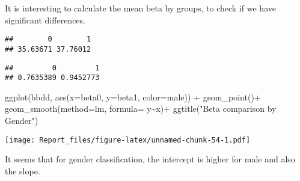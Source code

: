 \documentclass[
]{article}
\newenvironment{Shaded}{\begin{snugshade}}{\end{snugshade}}
\newcommand{\AttributeTok}[1]{\textcolor[rgb]{0.77,0.63,0.00}{#1}}
\newcommand{\FunctionTok}[1]{\textcolor[rgb]{0.00,0.00,0.00}{#1}}
\newcommand{\NormalTok}[1]{#1}
\newcommand{\OtherTok}[1]{\textcolor[rgb]{0.56,0.35,0.01}{#1}}
\newcommand{\SpecialCharTok}[1]{\textcolor[rgb]{0.00,0.00,0.00}{#1}}
\newcommand{\StringTok}[1]{\textcolor[rgb]{0.31,0.60,0.02}{#1}}
\begin{document}
It is interesting to calculate the mean beta by groups, to check if we
have significant differences.

\begin{Shaded}
\end{Shaded}

\begin{verbatim}
##        0        1 
## 35.63671 37.76012
\end{verbatim}

\begin{Shaded}
\end{Shaded}

\begin{verbatim}
##         0         1 
## 0.7635389 0.9452773
\end{verbatim}

\begin{Shaded}
\begin{Highlighting}[]
\FunctionTok{ggplot}\NormalTok{(bbdd, }\FunctionTok{aes}\NormalTok{(}\AttributeTok{x=}\NormalTok{beta0, }\AttributeTok{y=}\NormalTok{beta1, }\AttributeTok{color=}\NormalTok{male)) }\SpecialCharTok{+}
\FunctionTok{geom\_point}\NormalTok{()}\SpecialCharTok{+}
  \FunctionTok{geom\_smooth}\NormalTok{(}\AttributeTok{method=}\StringTok{\textquotesingle{}lm\textquotesingle{}}\NormalTok{, }\AttributeTok{formula=}\NormalTok{ y}\SpecialCharTok{\textasciitilde{}}\NormalTok{x)}\SpecialCharTok{+}
\FunctionTok{ggtitle}\NormalTok{(}\StringTok{"Beta comparison by Gender"}\NormalTok{)}
\end{Highlighting}
\end{Shaded}

\texttt{[image: Report\_files/figure-latex/unnamed-chunk-54-1.pdf]}

It seems that for gender classification, the intercept is higher for
male and also the slope.
\end{document}

